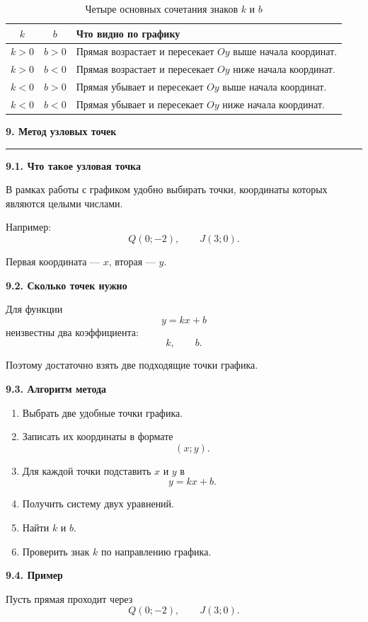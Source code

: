\documentclass[a4paper,12pt]{article}
\newcommand{\topic}[1]{%
  \vspace{0.4em}
  {\Large\bfseries\color{darkaccent}#1\par}
  \vspace{0.25em}
  {\color{accent}\rule{\linewidth}{0.7pt}}
  \vspace{0.45em}
}
\newcommand{\subtopic}[1]{%
  \vspace{0.5em}
  {\large\bfseries\color{darkaccent}#1\par}
  \vspace{0.2em}
}
\begin{document}
\begin{table}[ht]
\centering
\caption{Четыре основных сочетания знаков \(k\) и \(b\)}
\renewcommand{\arraystretch}{1.3}
\begin{tabularx}{0.88\linewidth}{@{}c c X@{}}
\toprule
\(k\) & \(b\) & Что видно по графику \\
\midrule
\(k>0\) & \(b>0\) &
Прямая возрастает и пересекает \(Oy\) выше начала координат.\\
\(k>0\) & \(b<0\) &
Прямая возрастает и пересекает \(Oy\) ниже начала координат.\\
\(k<0\) & \(b>0\) &
Прямая убывает и пересекает \(Oy\) выше начала координат.\\
\(k<0\) & \(b<0\) &
Прямая убывает и пересекает \(Oy\) ниже начала координат.\\
\bottomrule
\end{tabularx}
\end{table}

\topic{9. Метод узловых точек}

\subtopic{9.1. Что такое узловая точка}

В рамках работы с графиком удобно выбирать точки, координаты которых являются целыми числами.

Например:
\[
Q(0;-2),\qquad J(3;0).
\]

Первая координата --- \(x\), вторая --- \(y\).

\subtopic{9.2. Сколько точек нужно}

Для функции
\[
y=kx+b
\]
неизвестны два коэффициента:
\[
k,\qquad b.
\]

Поэтому достаточно взять две подходящие точки графика.

\subtopic{9.3. Алгоритм метода}

\begin{enumerate}
\item Выбрать две удобные точки графика.
\item Записать их координаты в формате
\[
(x;y).
\]
\item Для каждой точки подставить \(x\) и \(y\) в
\[
y=kx+b.
\]
\item Получить систему двух уравнений.
\item Найти \(k\) и \(b\).
\item Проверить знак \(k\) по направлению графика.
\end{enumerate}

\subtopic{9.4. Пример}

Пусть прямая проходит через
\[
Q(0;-2),
\qquad
J(3;0).
\]
\end{document}
